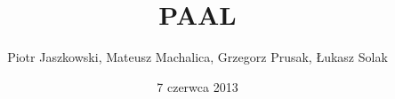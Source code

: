\documentclass[blue]{beamer}
\title{PAAL}
\author{Piotr Jaszkowski, Mateusz Machalica, Grzegorz Prusak, Łukasz Solak}
\date{7 czerwca 2013}
\begin{document}

\begin{frame}
\titlepage
\end{frame}
\end{document}
